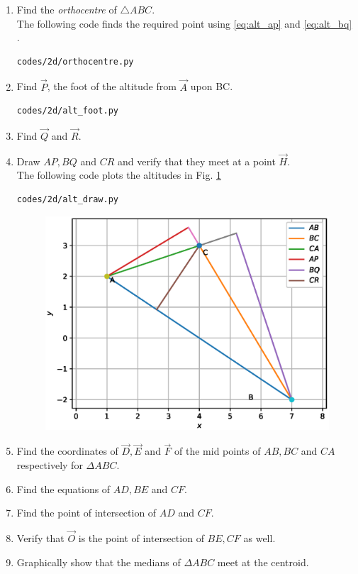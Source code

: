 \renewcommand{\theequation}{\theenumi}

\begin{enumerate}[label=\arabic*.,ref=\thesubsection.\theenumi]
\item
Find the {\em orthocentre} of  $\triangle ABC$.
\\
\solution The following code finds the required point using \eqref{eq:alt_ap} and \eqref{eq:alt_bq}
.
\begin{lstlisting}
codes/2d/orthocentre.py
\end{lstlisting}

\item Find $\vec{P}$, the foot of the altitude from $\vec{A}$ upon BC.
%
\\
\solution 
\begin{lstlisting}
codes/2d/alt_foot.py
\end{lstlisting}
\item Find $\vec{Q}$ and $\vec{R}$.
\item Draw $AP, BQ$ and $CR$ and verify that they meet at a point 
$\vec{H}$.  
\\
\solution The following code plots the altitudes in Fig. \ref{fig:alt_triangle}
\begin{lstlisting}
codes/2d/alt_draw.py
\end{lstlisting}
\begin{figure}
\centering
\includegraphics[width=\columnwidth]{./line/figs/alt_triangle.eps}
\caption{}
\label{fig:alt_triangle}
\end{figure}
\item
Find the coordinates of $\vec{D}, \vec{E}$ and $\vec{F}$ of the mid points of $AB, BC$ and $CA$ respectively 
for  $\Delta ABC$. 
\item
Find the equations of $AD,BE$ and $CF$. 
%
\item
\label{prob:median}
Find the point of intersection of $AD$ and $CF$.
\item
Verify that $\vec{O}$ is the point of intersection of $BE,CF$ as 
well.
\item
Graphically show that the medians of $\Delta ABC$ meet at the centroid.
\end{enumerate}


